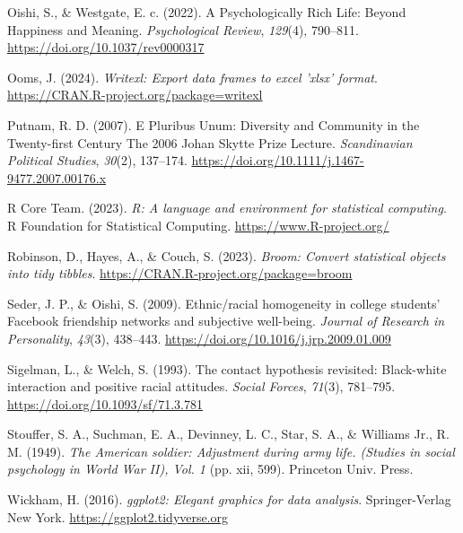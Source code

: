 \documentclass[
  man,floatsintext]{apa7}
\newlength{\cslhangindent}
\newlength{\cslentryspacingunit} %
\newenvironment{CSLReferences}[2] %
 {%
  \setlength{\parindent}{0pt}
  \ifodd #1
  \let\oldpar\par
  \def\par{\hangindent=\cslhangindent\oldpar}
  \fi
  \setlength{\parskip}{#2\cslentryspacingunit}
 }%
 {}
\begin{document}
\begin{CSLReferences}{1}{0}
\leavevmode{}%
Oishi, S., \& Westgate, E. c. (2022). A {Psychologically Rich Life}: {Beyond Happiness} and {Meaning}. \emph{Psychological Review}, \emph{129}(4), 790--811. \url{https://doi.org/10.1037/rev0000317}

\leavevmode{}%
Ooms, J. (2024). \emph{Writexl: Export data frames to excel 'xlsx' format}. \url{https://CRAN.R-project.org/package=writexl}

\leavevmode{}%
Putnam, R. D. (2007). E {Pluribus Unum}: {Diversity} and {Community} in the {Twenty-first Century The} 2006 {Johan Skytte Prize Lecture}. \emph{Scandinavian Political Studies}, \emph{30}(2), 137--174. \url{https://doi.org/10.1111/j.1467-9477.2007.00176.x}

\leavevmode{}%
R Core Team. (2023). \emph{R: A language and environment for statistical computing}. R Foundation for Statistical Computing. \url{https://www.R-project.org/}

\leavevmode{}%
Robinson, D., Hayes, A., \& Couch, S. (2023). \emph{Broom: Convert statistical objects into tidy tibbles}. \url{https://CRAN.R-project.org/package=broom}

\leavevmode{}%
Seder, J. P., \& Oishi, S. (2009). Ethnic/racial homogeneity in college students' {Facebook} friendship networks and subjective well-being. \emph{Journal of Research in Personality}, \emph{43}(3), 438--443. \url{https://doi.org/10.1016/j.jrp.2009.01.009}

\leavevmode{}%
Sigelman, L., \& Welch, S. (1993). The contact hypothesis revisited: Black-white interaction and positive racial attitudes. \emph{Social Forces}, \emph{71}(3), 781--795. \url{https://doi.org/10.1093/sf/71.3.781}

\leavevmode{}%
Stouffer, S. A., Suchman, E. A., Devinney, L. C., Star, S. A., \& Williams Jr., R. M. (1949). \emph{The {American} soldier: {Adjustment} during army life. ({Studies} in social psychology in {World War II}), {Vol}. 1} (pp. xii, 599). {Princeton Univ. Press}.

\leavevmode{}%
Wickham, H. (2016). \emph{ggplot2: Elegant graphics for data analysis}. Springer-Verlag New York. \url{https://ggplot2.tidyverse.org}


\end{CSLReferences}
\end{document}
